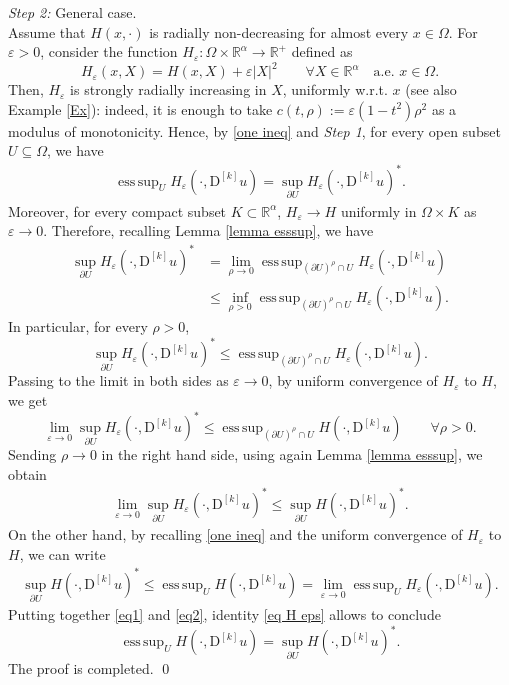 \documentclass[a4paper,11pt]{article}
\numberwithin{equation}{section}
\newcommand{\numberset}{\mathbb}
\newcommand{\eps}{\varepsilon}
\newcommand{\Om}{\Omega}
\newcommand{\R}{\numberset{R}}
\DeclareMathOperator*{\esssup}{ess\,sup}
\theoremstyle{definition}
\begin{document}
\noindent
\textit{Step 2:} General case.\\
Assume that $H(x,\cdot)$ is radially non-decreasing for almost every $x\in\Om$. For $\eps>0$, consider the function $H_\eps:\Om\times\R^\alpha\to\R^+$ defined as
$$
H_\eps(x,X)=H(x,X)+\eps|X|^2 \qquad\forall X\in\R^\alpha\quad\mbox{a.e. }x\in\Om.
$$
Then, $H_\eps$ is strongly radially increasing in $X$, uniformly w.r.t. $x$ (see also Example \ref{Ex}): indeed, it is enough to take $c(t,\rho):=\eps(1-t^2)\rho^2$ as a modulus of monotonicity. Hence, by \eqref{one ineq} and \textit{Step 1}, for every open subset $U\subseteq\Om$, we have
\begin{align}\label{eq H eps}
\esssup_U H_\eps(\cdot, \mathrm D ^{[k]}u)=\sup_{\partial U}H_\eps(\cdot,\mathrm D ^{[k]}u)^*.
\end{align}
Moreover, for every compact subset $K\subset\R^\alpha$, $H_\eps\to H$ uniformly in $\Om\times K$ as $\eps\to 0$. Therefore, recalling Lemma \eqref{lemma esssup}, we have
\begin{align*}
\sup_{\partial U}H_\eps(\cdot,\mathrm D ^{[k]}u)^*&=\lim_{\rho\to0}\esssup_{(\partial U)^\rho\cap U}H_\eps(\cdot, \mathrm D ^{[k]}u)\\
&\leq \inf_{\rho>0}\esssup_{(\partial U)^\rho\cap U}H_\eps(\cdot, \mathrm D ^{[k]}u).
\end{align*}
In particular, for every $\rho>0$,
$$
\sup_{\partial U}H_\eps(\cdot,\mathrm D ^{[k]}u)^*\leq \esssup_{(\partial U)^\rho\cap U}H_\eps(\cdot, \mathrm D ^{[k]}u).
$$
Passing to the limit in both sides as $\eps\to 0$, by uniform convergence of $H_\eps$ to $H$, we get
$$
\lim_{\eps\to0}\sup_{\partial U}H_\eps(\cdot,\mathrm D ^{[k]}u)^*\leq\esssup_{(\partial U)^\rho\cap U}H(\cdot, \mathrm D ^{[k]}u)\qquad\forall \rho>0.
$$
Sending $\rho\to0$ in the right hand side, using again Lemma \eqref{lemma esssup}, we obtain
\begin{align}\label{eq1}
\lim_{\eps\to0}\sup_{\partial U}H_\eps(\cdot,\mathrm D ^{[k]}u)^*\leq\sup_{\partial U}H(\cdot,\mathrm D ^{[k]}u)^*.
\end{align}
On the other hand, by recalling \eqref{one ineq} and the uniform convergence of $H_\eps$ to $H$, we can write
\begin{align}\label{eq2}
\sup_{\partial U}H(\cdot,\mathrm D ^{[k]}u)^*\leq\esssup_U H(\cdot, \mathrm D ^{[k]}u)=\lim_{\eps\to0}\esssup_U H_\eps(\cdot, \mathrm D ^{[k]}u).
\end{align}
Putting together \eqref{eq1} and \eqref{eq2}, identity \eqref{eq H eps} allows to conclude
$$
\esssup_U H(\cdot, \mathrm D ^{[k]}u)=\sup_{\partial U}H(\cdot,\mathrm D ^{[k]}u)^*.
$$
The proof is completed. \qed
\\
\end{document}

